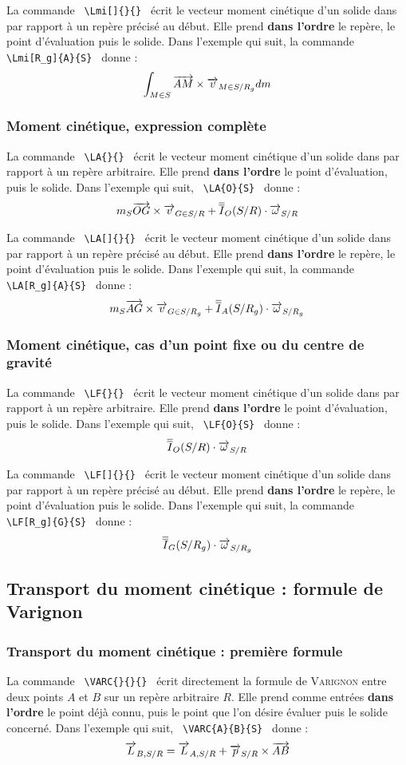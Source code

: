 \documentclass[12pt]{article}
\begin{document}
La commande \verb| \Lmi[]{}{} | écrit le vecteur moment cinétique d'un solide dans par rapport à un repère précisé au début. Elle prend \textbf{dans l'ordre} le repère, le point d'évaluation puis le solide. Dans l'exemple qui suit, la commande \verb| \Lmi[R_g]{A}{S} | donne : $$\Lmi[R_g]{A}{S}$$

\subsubsection{Moment cinétique, expression complète}
La commande \verb| \LA{}{} | écrit le vecteur moment cinétique d'un solide dans par rapport à un repère arbitraire. Elle prend \textbf{dans l'ordre} le point d'évaluation, puis le solide. Dans l'exemple qui suit, \verb| \LA{O}{S} | donne : $$\LA{O}{S}$$

La commande \verb| \LA[]{}{} | écrit le vecteur moment cinétique d'un solide dans par rapport à un repère précisé au début. Elle prend \textbf{dans l'ordre} le repère, le point d'évaluation puis le solide. Dans l'exemple qui suit, la commande \verb| \LA[R_g]{A}{S} | donne : $$\LA[R_g]{A}{S}$$

\subsubsection{Moment cinétique, cas d'un point fixe ou du centre de gravité}
La commande \verb| \LF{}{} | écrit le vecteur moment cinétique d'un solide dans par rapport à un repère arbitraire. Elle prend \textbf{dans l'ordre} le point d'évaluation, puis le solide. Dans l'exemple qui suit, \verb| \LF{O}{S} | donne : $$\LF{O}{S}$$

La commande \verb| \LF[]{}{} | écrit le vecteur moment cinétique d'un solide dans par rapport à un repère précisé au début. Elle prend \textbf{dans l'ordre} le repère, le point d'évaluation puis le solide. Dans l'exemple qui suit, la commande \verb| \LF[R_g]{G}{S} | donne : $$\LF[R_g]{G}{S}$$

\subsection{Transport du moment cinétique : formule de Varignon}

\subsubsection{Transport du moment cinétique : première formule}
La commande \verb| \VARC{}{}{} | écrit directement la formule de \textsc{Varignon} entre deux points $A$ et $B$ sur un repère arbitraire $R$. Elle prend comme entrées \textbf{dans l'ordre} le point déjà connu, puis le point que l'on désire évaluer puis le solide concerné. Dans l'exemple qui suit, \verb| \VARC{A}{B}{S} | donne : $$\VARC{A}{B}{S}$$
\end{document}
